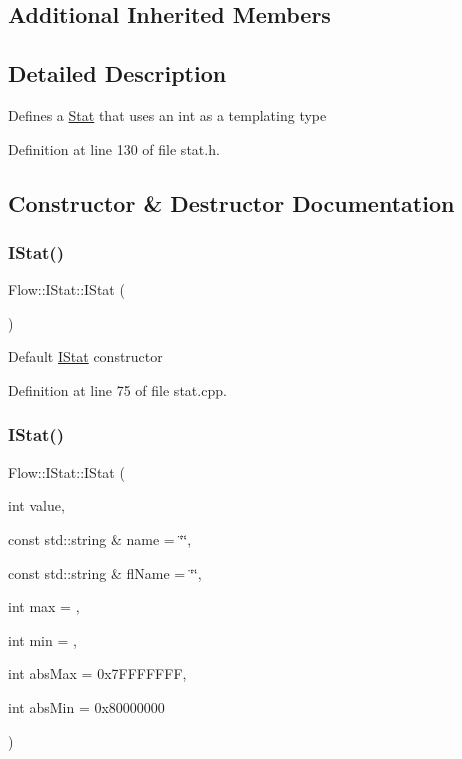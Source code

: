 \subsection*{Additional Inherited Members}


\subsection{Detailed Description}
Defines a \hyperlink{class_flow_1_1_stat}{Stat} that uses an int as a templating type 

Definition at line 130 of file stat.\+h.



\subsection{Constructor \& Destructor Documentation}
\hypertarget{class_flow_1_1_i_stat_ae9fdfde363f2c72f49cc12e6675b143d}{}\label{class_flow_1_1_i_stat_ae9fdfde363f2c72f49cc12e6675b143d} 
\subsubsection{\texorpdfstring{I\+Stat()}{IStat()}\hspace{0.1cm}{\footnotesize\ttfamily [1/2]}}
{\footnotesize\ttfamily Flow\+::\+I\+Stat\+::\+I\+Stat (\begin{DoxyParamCaption}{ }\end{DoxyParamCaption})}

Default \hyperlink{class_flow_1_1_i_stat}{I\+Stat} constructor 

Definition at line 75 of file stat.\+cpp.

\hypertarget{class_flow_1_1_i_stat_ad6eb279e84ed220e438b61aba2a8f67e}{}\label{class_flow_1_1_i_stat_ad6eb279e84ed220e438b61aba2a8f67e} 
\subsubsection{\texorpdfstring{I\+Stat()}{IStat()}\hspace{0.1cm}{\footnotesize\ttfamily [2/2]}}
{\footnotesize\ttfamily Flow\+::\+I\+Stat\+::\+I\+Stat (\begin{DoxyParamCaption}\item[{int}]{value,  }\item[{const std\+::string \&}]{name = {\ttfamily \char`\"{}\char`\"{}},  }\item[{const std\+::string \&}]{fl\+Name = {\ttfamily \char`\"{}\char`\"{}},  }\item[{int}]{max = {},  }\item[{int}]{min = {},  }\item[{int}]{abs\+Max = {\ttfamily 0x7FFFFFFF},  }\item[{int}]{abs\+Min = {\ttfamily 0x80000000} }\end{DoxyParamCaption})}

